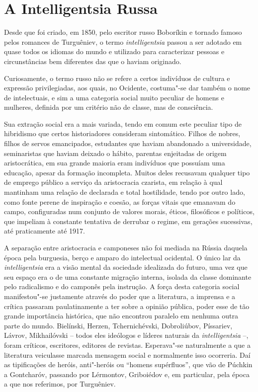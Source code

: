 \section{A Intelligentsia Russa}

Desde que foi criado, em 1850, pelo escritor russo Boboríkin e tornado
famoso pelos romances de Turguêniev, o termo \emph{intelligentsia}
passou a ser adotado em quase todos os idiomas do mundo e utilizado para
caracterizar pessoas e circunstâncias bem diferentes das que o haviam
originado.

Curiosamente, o termo russo não se refere a certos indivíduos de cultura
e expressão privilegiadas, aos quais, no Ocidente, costuma"-se dar também
o nome de intelectuais, e sim a uma categoria social muito peculiar de
homens e mulheres, definida por um critério não de classe, mas de
consciência.

Sua extração social era a mais variada, tendo em comum este peculiar
tipo de hibridismo que certos historiadores consideram sintomático.
Filhos de nobres, filhos de servos emancipados, estudantes que haviam
abandonado a universidade, seminaristas que haviam deixado o hábito,
parentas enjeitadas de origem aristocrática, em sua grande maioria eram
indivíduos que possuíam uma educação, apesar da formação incompleta.
Muitos deles recusavam qualquer tipo de emprego público a serviço da
aristocracia czarista, em relação à qual mantinham uma relação de
declarada e total hostilidade, tendo por outro lado, como fonte perene
de inspiração e coesão, as forças vitais que emanavam do campo,
configuradas num conjunto de valores morais, éticos, filosóficos e
políticos, que impeliam à constante tentativa de derrubar o regime, em
gerações sucessivas, até praticamente até 1917.

A separação entre aristocracia e camponeses não foi mediada na Rússia
daquela época pela burguesia, berço e amparo do intelectual ocidental. O
único lar da \emph{intelligentsia} era a visão mental da sociedade
idealizada do futuro, uma vez que seu espaço era o de uma constante
migração interna, isolada da classe dominante pelo radicalismo e do
camponês pela instrução. A força desta categoria social manifestou"-se
justamente através do poder que a literatura, a imprensa e a crítica
passaram paulatinamente a ter sobre a opinião pública, poder esse de tão
grande importância histórica, que não encontrou paralelo em nenhuma
outra parte do mundo. Bielínski, Herzen, Tchernichévski, Dobroliúbov,
Píssariev, Lávrov, Mikhailóvski -- todos eles ideólogos e líderes
naturais da \emph{intelligentsia} --, foram críticos, escritores,
editores de revistas. Esperava"-se naturalmente a que a literatura
veiculasse marcada mensagem social e normalmente isso ocorreria. Daí as
tipificações de heróis, anti"-heróis ou ``homens supérfluos'', que vão de
Púchkin a Gontcharóv, passando por Lérmontov, Griboiédov e, em
particular, pela época a que nos referimos, por Turguêniev.

